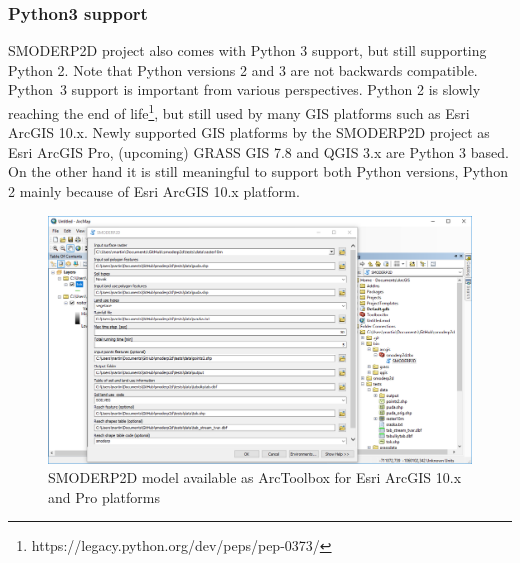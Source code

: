 \subsubsection{Python3 support}
SMODERP2D project also comes with Python 3 support, but still
supporting Python 2. Note that Python versions 2 and 3 are not
backwards compatible.  Python~3 support is important from various
perspectives. Python 2 is slowly reaching the end of
life\footnote{https://legacy.python.org/dev/peps/pep-0373/}, but still
used by many GIS platforms such as Esri ArcGIS 10.x. Newly supported
GIS platforms by the SMODERP2D project as Esri ArcGIS Pro, (upcoming)
GRASS GIS 7.8 and QGIS 3.x are Python 3 based. On the other hand it is
still meaningful to support both Python versions, Python 2 mainly
because of Esri Arc\-GIS 10.x platform.

\begin{figure}[ht!]
  \begin{center}
    \includegraphics[width=1.0\columnwidth]{figures/smoderp2d_arcgis.png}
    \caption{SMODERP2D model available as ArcToolbox for Esri ArcGIS
      10.x and Pro platforms}
    \label{fig:smoderp2d_arcgis}
  \end{center}
\end{figure}
